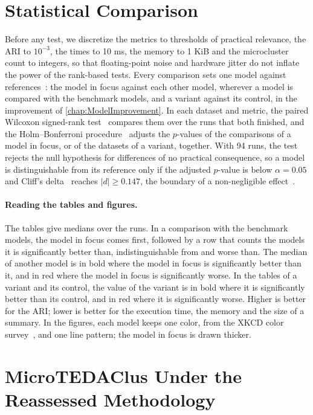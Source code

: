 \section{Statistical Comparison}
\label{sec:statistical_significance}

Before any test, we discretize the metrics to thresholds of practical relevance, the ARI to $10^{-3}$, the times to 10 ms, the memory to 1 KiB and the microcluster count to integers, so that floating-point noise and hardware jitter do not inflate the power of the rank-based tests. Every comparison sets one model against references~\cite{demsar2006statistical}: the model in focus against each other model, wherever a model is compared with the benchmark models, and a variant against its control, in the improvement of \cref{chap:ModelImprovement}. In each dataset and metric, the paired Wilcoxon signed-rank test~\cite{wilcoxon1945individual} compares them over the runs that both finished, and the Holm--Bonferroni procedure~\cite{holm1979simple} adjusts the $p$-values of the comparisons of a model in focus, or of the datasets of a variant, together. With 94 runs, the test rejects the null hypothesis for differences of no practical consequence, so a model is distinguishable from its reference only if the adjusted $p$-value is below $\alpha = 0.05$ and Cliff's delta~\cite{cliff1993dominance} reaches $\vert d \vert \ge 0.147$, the boundary of a non-negligible effect~\cite{romano2006appropriate}.

\paragraph{Reading the tables and figures.} The tables give medians over the runs. In a comparison with the benchmark models, the model in focus comes first, followed by a row that counts the models it is significantly better than, indistinguishable from and worse than. The median of another model is in bold where the model in focus is significantly better than it, and in red where the model in focus is significantly worse. In the tables of a variant and its control, the value of the variant is in bold where it is significantly better than its control, and in red where it is significantly worse. Higher is better for the ARI; lower is better for the execution time, the memory and the size of a summary. In the figures, each model keeps one color, from the XKCD color survey~\cite{xkcd1279}, and one line pattern; the model in focus is drawn thicker.

\section{MicroTEDAClus Under the Reassessed Methodology}
\label{sec:reassessment_results}

